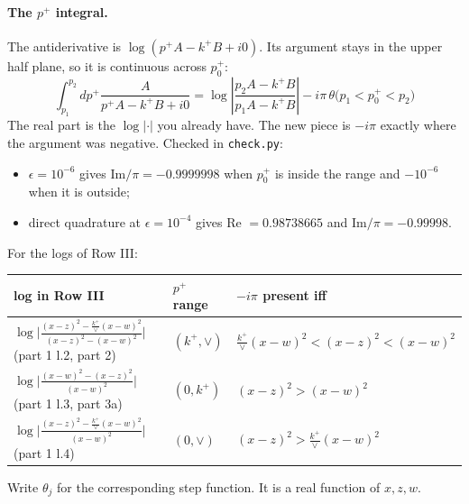 \documentclass[10pt]{article}
\numberwithin{equation}{section}
\begin{document}
\paragraph{The $p^+$ integral.} The antiderivative is $\log(p^+A-k^+B+i0)$. Its argument stays in the upper half plane, so it is continuous across $p_0^+$:
\begin{equation}
\boxed{\int_{p_1}^{p_2}dp^+\frac{A}{p^+A-k^+B+i0}=\log\left|\frac{p_2A-k^+B}{p_1A-k^+B}\right|-i\pi\,\theta\big(p_1<p_0^+<p_2\big)}\label{eq:main}
\end{equation}
The real part is the $\log|\cdot|$ you already have. The new piece is $-i\pi$ exactly where the argument was negative. Checked in \texttt{check.py}:
\begin{itemize}
\item $\epsilon=10^{-6}$ gives Im$/\pi=-0.9999998$ when $p_0^+$ is inside the range and $-10^{-6}$ when it is outside;
\item direct quadrature at $\epsilon=10^{-4}$ gives Re $=0.98738665$ and Im$/\pi=-0.99998$.
\end{itemize}
For the logs of Row III:
\begin{center}
\renewcommand{\arraystretch}{1.5}
\begin{tabular}{@{}lll@{}}\toprule
log in Row III & $p^+$ range & $-i\pi$ present iff\\\midrule
$\log\big|\frac{(x-z)^2-\frac{k^+}{\vee}(x-w)^2}{(x-z)^2-(x-w)^2}\big|$ (part 1 l.2, part 2) & $(k^+,\vee)$ & $\frac{k^+}{\vee}(x-w)^2<(x-z)^2<(x-w)^2$\\
$\log\big|\frac{(x-w)^2-(x-z)^2}{(x-w)^2}\big|$ (part 1 l.3, part 3a) & $(0,k^+)$ & $(x-z)^2>(x-w)^2$\\
$\log\big|\frac{(x-z)^2-\frac{k^+}{\vee}(x-w)^2}{(x-w)^2}\big|$ (part 1 l.4) & $(0,\vee)$ & $(x-z)^2>\frac{k^+}{\vee}(x-w)^2$\\\bottomrule
\end{tabular}
\end{center}
Write $\theta_j$ for the corresponding step function. It is a real function of $x,z,w$.
\end{document}
